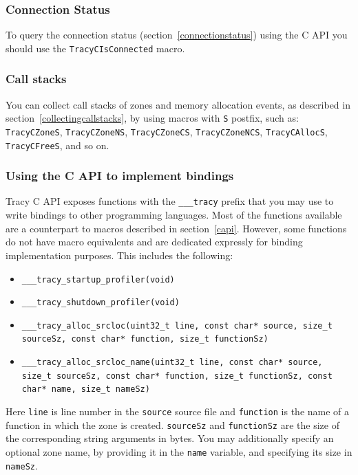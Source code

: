 \documentclass[hidelinks,titlepage,a4paper,twoside]{article}
\begin{document}
\subsubsection{Connection Status}

To query the connection status (section~\ref{connectionstatus}) using the C API you should use the \texttt{TracyCIsConnected} macro.

\subsubsection{Call stacks}

You can collect call stacks of zones and memory allocation events, as described in section~\ref{collectingcallstacks}, by using macros with \texttt{S} postfix, such as: \texttt{TracyCZoneS}, \texttt{TracyCZoneNS}, \texttt{TracyCZoneCS}, \texttt{TracyCZoneNCS}, \texttt{TracyCAllocS}, \texttt{TracyCFreeS}, and so on.

\subsubsection{Using the C API to implement bindings}
\label{capibindings}

Tracy C API exposes functions with the \texttt{\_\_\_tracy} prefix that you may use to write bindings to other programming languages. Most of the functions available are a counterpart to macros described in section~\ref{capi}. However, some functions do not have macro equivalents and are dedicated expressly for binding implementation purposes. This includes the following:

\begin{itemize}
\item \texttt{\_\_\_tracy\_startup\_profiler(void)}
\item \texttt{\_\_\_tracy\_shutdown\_profiler(void)}
\item \texttt{\_\_\_tracy\_alloc\_srcloc(uint32\_t line, const char* source, size\_t sourceSz, const char* function, size\_t functionSz)}
\item \texttt{\_\_\_tracy\_alloc\_srcloc\_name(uint32\_t line, const char* source, size\_t sourceSz, const char* function, size\_t functionSz, const char* name, size\_t nameSz)}
\end{itemize}

Here \texttt{line} is line number in the \texttt{source} source file and \texttt{function} is the
name of a function in which the zone is created. \texttt{sourceSz} and \texttt{functionSz} are the
size of the corresponding string arguments in bytes. You may additionally specify an optional zone
name, by providing it in the \texttt{name} variable, and specifying its size in \texttt{nameSz}.
\end{document}
